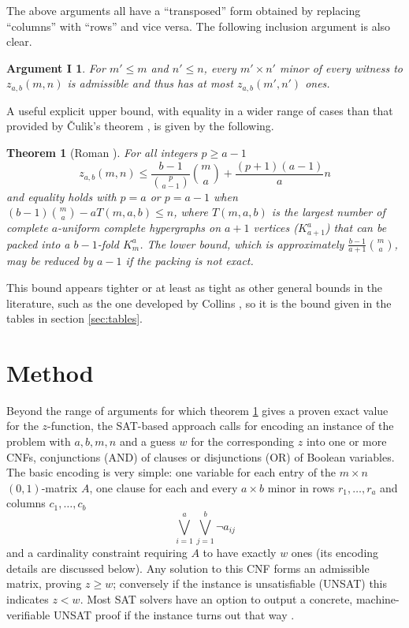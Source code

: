 \documentclass[10pt,a4paper]{article}
\newtheorem{theorem}{Theorem}[section]
\newtheorem*{argI}{Argument I}
\theoremstyle{definition}
\begin{document}
	The above arguments all have a ``transposed'' form obtained by replacing ``columns'' with ``rows'' and vice versa. The following inclusion argument is also clear.
	\begin{argI}
		For $m'\le m$ and $n'\le n$, every $m'\times n'$ minor of every witness to $z_{a,b}(m,n)$ is admissible and thus has at most $z_{a,b}(m',n')$ ones.
	\end{argI}
	
	A useful explicit upper bound, with equality in a wider range of cases than that provided by Čulik's theorem \cite{culik}, is given by the following.
	\begin{theorem}[Roman \cite{roman}]\label{thm:packlimit}
		For all integers $p\ge a-1$
		\begin{equation*}
			z_{a,b}(m,n)\le\frac{b-1}{\binom p{a-1}}\binom ma+\frac{(p+1)(a-1)}an
		\end{equation*}
		and equality holds with $p=a$ or $p=a-1$ when $(b-1)\binom ma-aT(m,a,b)\le n$, where $T(m,a,b)$ is the largest number of complete $a$-uniform complete hypergraphs on $a+1$ vertices ($K_{a+1}^a$) that can be packed into a $b-1$-fold $K_m^a$. The lower bound, which is approximately $\frac{b-1}{a+1}\binom ma$, may be reduced by $a-1$ if the packing is not exact.
	\end{theorem}
	
	This bound appears tighter or at least as tight as other general bounds in the literature, such as the one developed by Collins \cite{collins}, so it is the bound given in the tables in section \ref{sec:tables}.
	
	\section{Method}\label{sec:method}
	
	Beyond the range of arguments for which theorem \ref{thm:packlimit} gives a proven exact value for the $z$-function, the SAT-based approach calls for encoding an instance of the problem with $a,b,m,n$ and a guess $w$ for the corresponding $z$ into one or more CNFs, conjunctions (AND) of clauses or disjunctions (OR) of Boolean variables. The basic encoding is very simple: one variable for each entry of the $m\times n$ $(0,1)$-matrix $A$, one clause for each and every $a\times b$ minor in rows $r_1,\dots,r_a$ and columns $c_1,\dots,c_b$
	\begin{equation*}
		\bigvee_{i=1}^a\bigvee_{j=1}^b\neg a_{ij}
	\end{equation*}
	and a cardinality constraint requiring $A$ to have exactly $w$ ones (its encoding details are discussed below). Any solution to this CNF forms an admissible matrix, proving $z\ge w$; conversely if the instance is unsatisfiable (UNSAT) this indicates $z<w$. Most SAT solvers have an option to output a concrete, machine-verifiable UNSAT proof if the instance turns out that way \cite{drattrim}.
	
\end{document}
